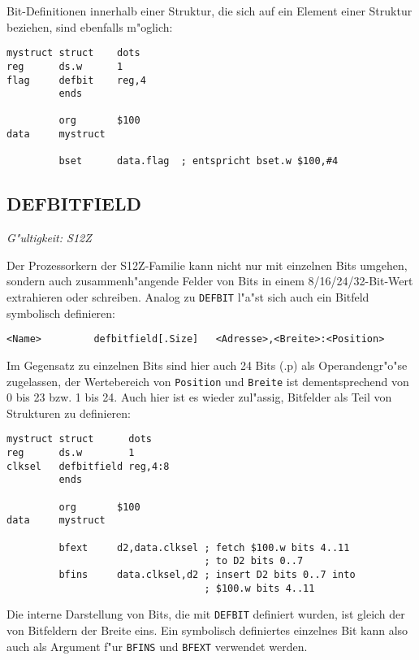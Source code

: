 \documentclass[12pt,a4paper,twoside]{report}
\makeatletter
\newcommand{\tty}[1]{{\tt #1}}
\newcommand{\ttindex}[1]{\index{#1@{\tt #1}}}
\makeatother
\begin{document}
Bit-Definitionen innerhalb einer Struktur, die sich auf ein Element
einer Struktur beziehen, sind ebenfalls m"oglich:
\begin{verbatim}
mystruct struct    dots
reg      ds.w      1
flag     defbit    reg,4
         ends

         org       $100
data     mystruct

         bset      data.flag  ; entspricht bset.w $100,#4
\end{verbatim}


\subsection{DEFBITFIELD}
\ttindex{DEFBITFIELD}

{\em G"ultigkeit: S12Z}

Der Prozessorkern der S12Z-Familie kann nicht nur mit einzelnen Bits
umgehen, sondern auch zusammenh"angende Felder von Bits in einem
8/16/24/32-Bit-Wert extrahieren oder schreiben.  Analog zu
\tty{DEFBIT} l"a"st sich auch ein Bitfeld symbolisch definieren:
\begin{verbatim}
<Name>         defbitfield[.Size]   <Adresse>,<Breite>:<Position>
\end{verbatim}
Im Gegensatz zu einzelnen Bits sind hier auch 24 Bits (.p) als
Operandengr"o"se zugelassen, der Wertebereich von \tty{Position} und
\tty{Breite} ist dementsprechend von 0 bis 23 bzw. 1 bis 24.  Auch
hier ist es wieder zul"assig, Bitfelder als Teil von Strukturen zu
definieren:
\begin{verbatim}
mystruct struct      dots
reg      ds.w        1
clksel   defbitfield reg,4:8
         ends

         org       $100
data     mystruct

         bfext     d2,data.clksel ; fetch $100.w bits 4..11
                                  ; to D2 bits 0..7
         bfins     data.clksel,d2 ; insert D2 bits 0..7 into
                                  ; $100.w bits 4..11
\end{verbatim}
Die interne Darstellung von Bits, die mit \tty{DEFBIT} definiert
wurden, ist gleich der von Bitfeldern der Breite eins.  Ein
symbolisch definiertes einzelnes Bit kann also auch als Argument
f"ur \tty{BFINS} und \tty{BFEXT} verwendet werden.

\end{document}
